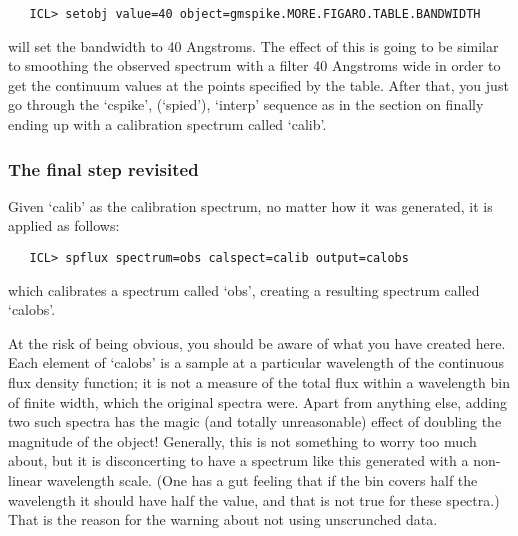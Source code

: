 \begin{verbatim}
   ICL> setobj value=40 object=gmspike.MORE.FIGARO.TABLE.BANDWIDTH
\end{verbatim}

   will set the bandwidth to 40 Angstroms.  The effect of this is going
   to be similar to smoothing the observed spectrum with a filter 40
   Angstroms wide in order to get the continuum values at the points
   specified by the table.  After that, you just go through the `cspike',
   (`spied'), `interp' sequence as in
   {the section on }
   finally ending up with a calibration spectrum called `calib'.


\subsubsection{\label{techno5final2}The final step revisited}

   Given `calib' as the calibration spectrum, no matter how it was
   generated, it is applied as follows:

\begin{verbatim}
   ICL> spflux spectrum=obs calspect=calib output=calobs
\end{verbatim}

   which calibrates a spectrum called `obs', creating a resulting
   spectrum called `calobs'.

   At the risk of being obvious, you should be aware of what you have
   created here.  Each element of `calobs' is a sample at a particular
   wavelength of the continuous flux density function; it is not a
   measure of the total flux within a wavelength bin of finite width,
   which the original spectra were.  Apart from anything else, adding
   two such spectra has the magic (and totally unreasonable) effect of
   doubling the magnitude of the object! Generally, this is not
   something to worry too much about, but it is disconcerting to have a
   spectrum like this generated with a non-linear wavelength scale. (One
   has a gut feeling that if the bin covers half the wavelength it
   should have half the value, and that is not true for these spectra.)
   That is the reason for the warning about not using unscrunched data.



